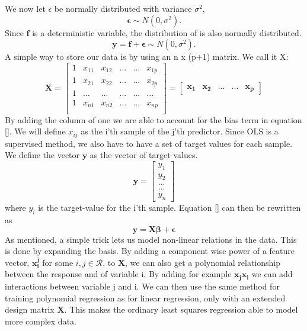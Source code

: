 \\
\\
We now let $\epsilon$ be normally distributed with variance $\sigma^2$, 
\begin{equation}
    \boldsymbol{\epsilon} \sim N(0, \sigma^2).
\end{equation}
Since $\boldsymbol{f}$ is a deterministic variable, the distribution of  is also normally distributed.
\begin{equation}
    \boldsymbol{y} = \boldsymbol{f} + \boldsymbol{\epsilon} \sim N(0, \sigma^2).
    \label{eqn:yfe}
\end{equation}
A simple way to store our data is by using an n x (p+1) matrix. We call it X:
\begin{equation}
    \boldsymbol{X} = 
    \begin{bmatrix}
    1 &x_{11} & x_{12} & ... & ... & x_{1p} \\
    1 &x_{21} & x_{22} & ... & ... & x_{2p} \\
    1&... & ... & ... & ... & ... \\
    1 & x_{n1} & x_{n2} & ... & ... & x_{np}\\
    \end{bmatrix}
    = 
    \begin{bmatrix}
    \boldsymbol{x_1} & \boldsymbol{x_2} & ... & ... & \boldsymbol{x_p}
    \end{bmatrix}
\end{equation}
By adding the column of one we are able to account for the bias term in equation \ref{}.
We will define $x_{ij}$ as the i'th sample of the j'th predictor.
Since OLS is a supervised method, we also have to have a set of target values for each sample. We define the vector $\boldsymbol{y}$ as the vector of target values. 
\begin{equation}
    \boldsymbol{y} = 
    \begin{bmatrix}
    y_1 \\
    y_2 \\
    ... \\
    ... \\
    y_n
    \end{bmatrix}
\end{equation}
where $y_i$ is the target-value for the i'th sample. Equation \ref{} can then be rewritten as
\begin{equation}
 \boldsymbol{y} = \boldsymbol{X\beta} + \boldsymbol{\epsilon}
\end{equation}
As mentioned, a simple trick lets us model non-linear relations in the data. This is done by expanding the basis. By adding a component wise power of a feature vector, $\boldsymbol{x_i^j}$ for some $i,j\in\mathcal{R}$, to $\boldsymbol{X}$, we can also get a polynomial relationship between the response and of variable i. By adding for example $\boldsymbol{x_jx_i}$ we can add interactions between variable j and i. We can then use the same method for training polynomial regression as for linear regression, only with an extended design matrix $\boldsymbol{X}$. This makes the ordinary least squares regression able to model more complex data.

